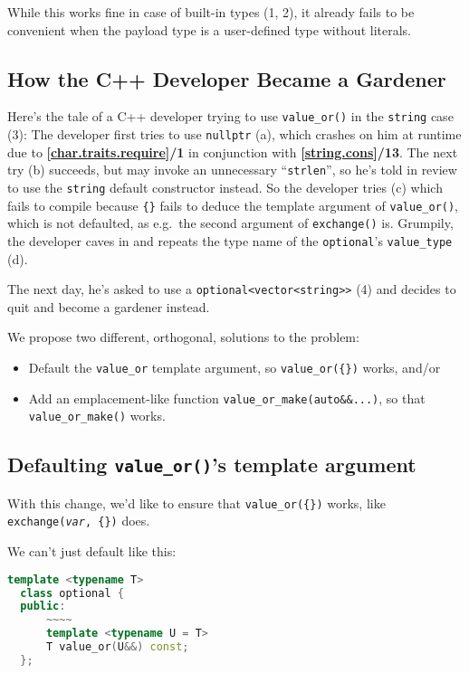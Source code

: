 \documentclass[11pt]{article}
\newcommand{\isnref}[2]{\textbf{[\href{https://wg21.link/#1\##2}{#1}]/#2}}
\begin{document}
While this works fine in case of built-in types (1, 2), it already
fails to be convenient when the payload type is a user-defined type
without literals.

\subsection{How the C++ Developer Became a Gardener}

Here's the tale of a C++ developer trying to use \texttt{value\_or()}
in the \texttt{string} case (3): The developer first tries to use
\texttt{nullptr} (a), which crashes on him at runtime due to
\isnref{char.traits.require}1 in conjunction with
\isnref{string.cons}{13}. The next try (b) succeeds, but may invoke an
unnecessary ``\texttt{strlen}'', so he's told in review to use the
\texttt{string} default constructor instead. So the developer tries
(c) which fails to compile because \texttt{\{\}} fails to deduce the
template argument of \texttt{value\_or()}, which is not defaulted, as
e.g.\ the second argument of \texttt{exchange()} is. Grumpily, the
developer caves in and repeats the type name of the
\texttt{optional}'s \texttt{value\_type} (d).

The next day, he's asked to use a \texttt{optional<vector<string>>}
(4) and decides to quit and become a gardener instead.

We propose two different, orthogonal, solutions to the problem:
\begin{itemize}
\item Default the \texttt{value\_or} template argument, so
  \texttt{value\_or(\{\})} works, and/or
\item Add an emplacement-like function \texttt{value\_or\_make(auto\&\&...)}, so
  that \texttt{value\_or\_make()} works.
\end{itemize}

\subsection{Defaulting \texttt{value\_or()}'s template argument}
\label{sec:defaulting}

With this change, we'd like to ensure that \texttt{value\_or(\{\})}
works, like \texttt{exchange(\textit{var}, \{\})} does.

We can't just default like this:

\begin{lstlisting}[language=c++]
  template <typename T>
  class optional {
  public:
      ~~~~
      template <typename U = T>
      T value_or(U&&) const;
  };
\end{lstlisting}
\end{document}
